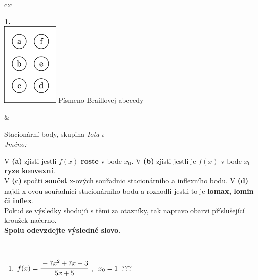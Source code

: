 \documentclass[10pt]{report}
\begin{document}
\begin{tabular}{c:c}
\begin{minipage}[c][104.5mm][t]{0.5\linewidth}
\begin{center}
\begin{minipage}{0.79\linewidth}
\end{minipage}
\begin{minipage}{0.20\linewidth}
\begin{center}
{\Huge\bfseries 1.} \\[2mm]
\includegraphics[height=40mm]{../images/braille.png}
{\small Písmeno Braillovej abecedy}
\end{center}
\end{minipage}
\end{center}
\end{minipage}
&
\begin{minipage}[c][104.5mm][t]{0.5\linewidth}
\begin{center}
\vspace{7mm}
{\huge Stacionární body, skupina \textit{Iota $\iota$} -}\\[5mm]
\textit{Jméno:}\phantom{xxxxxxxxxxxxxxxxxxxxxxxxxxxxxxxxxxxxxxxxxxxxxxxxxxxxxxxxxxxxxxxxx}\\[5mm]
\begin{minipage}{0.95\linewidth}
\begin{center}
{\small V \textbf{(a)} zjisti jestli $f(x)$ \textbf{roste} v bode $x_0$. V \textbf{(b)} zjisti jestli je $f(x)$ v bode $x_0$ \textbf{ryze konvexní}.\\V \textbf{(c)} spočti \textbf{součet} x-ových souřadnic stacionárního a inflexního bodu. V \textbf{(d)} najdi x-ovou souřadnici stacionárního bodu a rozhodli jestli to je \textbf{lomax, lomin či inflex}.\\Pokud se výsledky shodujú s těmi za otazníky, tak napravo obarvi příslušející kroužek načerno.\\\textbf{Spolu odevzdejte výsledné slovo}}.
\end{center}
\end{minipage}
\\[1mm]
\begin{minipage}{0.79\linewidth}
\begin{center}
\begin{varwidth}{\linewidth}
\begin{enumerate}
\normalsize
\item $f(x)=\cfrac{-7x^2+7x-3}{5x+5}\enspace , \enspace x_0=1$\quad \dotfill\; ???\;\dotfill \quad {}

\end{enumerate}
\end{varwidth}
\end{center}
\end{minipage}
\end{center}
\end{minipage}
\end{tabular}
\end{document}
